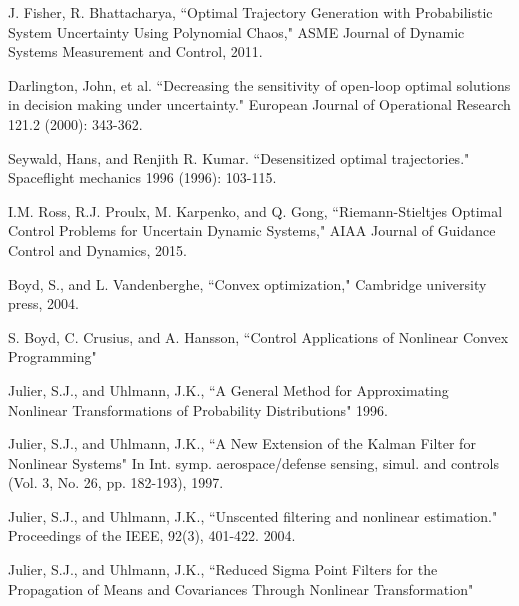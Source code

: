 \documentclass[10pt,a4paper]{article}
\begin{document}
	
	\begin{thebibliography}{1}
		
		
		J. Fisher, R. Bhattacharya, ``Optimal Trajectory Generation with Probabilistic System Uncertainty Using Polynomial Chaos," ASME Journal of Dynamic Systems Measurement and Control, 2011.
		
		Darlington, John, et al. ``Decreasing the sensitivity of open-loop optimal solutions in decision making under uncertainty." European Journal of Operational Research 121.2 (2000): 343-362.
		
		Seywald, Hans, and Renjith R. Kumar. ``Desensitized optimal trajectories." Spaceflight mechanics 1996 (1996): 103-115.
		
				I.M. Ross, R.J. Proulx, M. Karpenko, and Q. Gong, ``Riemann-Stieltjes Optimal Control Problems for Uncertain Dynamic Systems," AIAA Journal of Guidance Control and Dynamics, 2015.
		
		Boyd, S., and L. Vandenberghe, ``Convex optimization," Cambridge university press, 2004.
		
		S. Boyd, C. Crusius, and A. Hansson, ``Control Applications of Nonlinear Convex Programming"
		
		
		Julier, S.J., and Uhlmann, J.K., ``A General Method for Approximating Nonlinear Transformations of Probability Distributions" 1996.

		Julier, S.J., and Uhlmann, J.K., ``A New Extension of the Kalman Filter for Nonlinear Systems" In Int. symp. aerospace/defense sensing, simul. and controls (Vol. 3, No. 26, pp. 182-193), 1997.
		
		Julier, S.J., and Uhlmann, J.K., ``Unscented filtering and nonlinear estimation." Proceedings of the IEEE, 92(3), 401-422. 2004.
		
		Julier, S.J., and Uhlmann, J.K., ``Reduced Sigma Point Filters for the Propagation of Means and Covariances Through Nonlinear Transformation"
				

\end{thebibliography}
\end{document}
